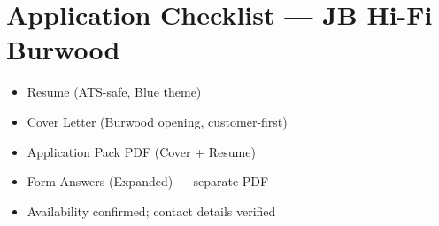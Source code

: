 \documentclass[a4paper,10pt]{article}
\begin{document}
\section*{Application Checklist — JB Hi-Fi Burwood}
\begin{itemize}
\item Resume (ATS-safe, Blue theme)
\item Cover Letter (Burwood opening, customer-first)
\item Application Pack PDF (Cover + Resume)
\item Form Answers (Expanded) — separate PDF
\item Availability confirmed; contact details verified
\end{itemize}
\end{document}
